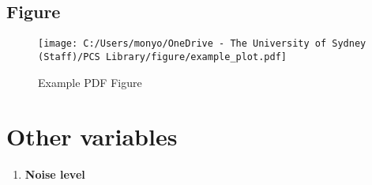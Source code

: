 \documentclass[11pt]{article}
\begin{document}
\subsection{Figure}
\begin{figure}[h!]
    \centering
    \texttt{[image: C:/Users/monyo/OneDrive - The University of Sydney (Staff)/PCS Library/figure/example\_plot.pdf]}
    \caption{Example PDF Figure}
    \label{fig:example}
\end{figure}



\section*{Other variables}

\begin{enumerate}
    \item \textbf{Noise level}

\end{enumerate}
%
%
\end{document}
